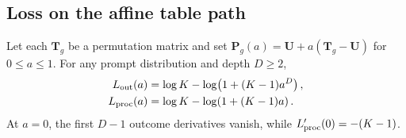 \subsection{Loss on the affine table path}
\label{app:affine-path-proof}

\begin{proposition}
\label{prop:loss-path}
Let each $\bm{T}_g$ be a permutation matrix and set $\bm{P}_g(a)=\bm{U}+a(\bm{T}_g-\bm{U})$ for
$0\le a\le1$. For any prompt distribution and depth $D\ge2$,
\begin{align}
 L_{\rm out}(a)&=\log K-\log\!\left(1+(K-1)a^D\right),
 \label{eq:outcome-flat-path}\\
 L_{\rm proc}(a)&=\log K-\log\!\left(1+(K-1)a\right).
 \label{eq:process-linear-path}
\end{align}
At $a=0$, the first $D-1$ outcome derivatives vanish, while
$L_{\rm proc}'(0)=-(K-1)$.
\end{proposition}
